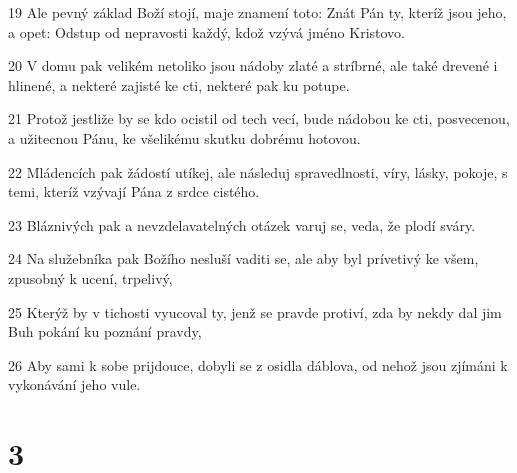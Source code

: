 \par 19 Ale pevný základ Boží stojí, maje znamení toto: Znát Pán ty, kteríž jsou jeho, a opet: Odstup od nepravosti každý, kdož vzývá jméno Kristovo.
\par 20 V domu pak velikém netoliko jsou nádoby zlaté a stríbrné, ale také drevené i hlinené, a nekteré zajisté ke cti, nekteré pak ku potupe.
\par 21 Protož jestliže by se kdo ocistil od tech vecí, bude nádobou ke cti, posvecenou, a užitecnou Pánu, ke všelikému skutku dobrému hotovou.
\par 22 Mládencích pak žádostí utíkej, ale následuj spravedlnosti, víry, lásky, pokoje, s temi, kteríž vzývají Pána z srdce cistého.
\par 23 Bláznivých pak a nevzdelavatelných otázek varuj se, veda, že plodí sváry.
\par 24 Na služebníka pak Božího nesluší vaditi se, ale aby byl prívetivý ke všem, zpusobný k ucení, trpelivý,
\par 25 Kterýž by v tichosti vyucoval ty, jenž se pravde protiví, zda by nekdy dal jim Buh pokání ku poznání pravdy,
\par 26 Aby sami k sobe prijdouce, dobyli se z osidla dáblova, od nehož jsou zjímáni k vykonávání jeho vule.

\chapter{3}

